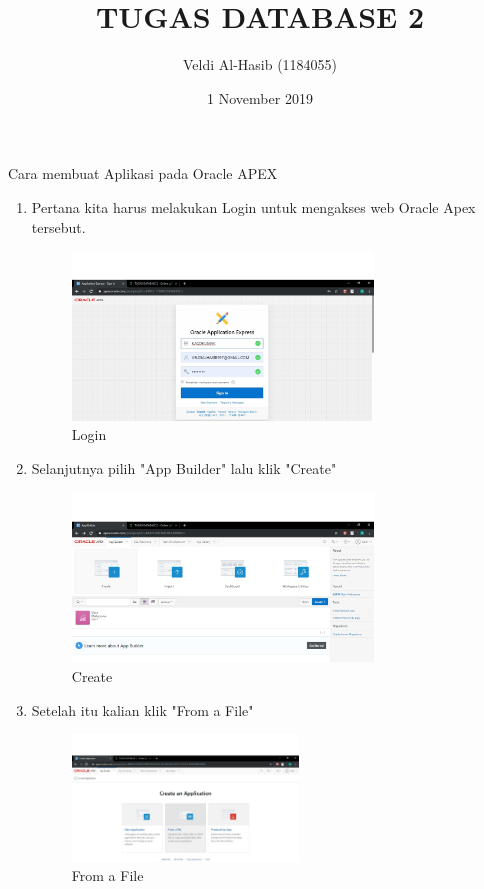 \documentclass{article}
\title{TUGAS DATABASE 2}
\author{Veldi Al-Hasib (1184055) }
\date{1 November 2019}
\begin{document}
\maketitle

\par
Cara membuat Aplikasi pada Oracle APEX
\begin{enumerate}
    \item Pertana kita harus melakukan Login untuk mengakses web Oracle Apex tersebut.
    \begin{figure}[h]
	\centering
	\includegraphics[width=8cm]{Figure/LOGIN.jpg}
	\caption{Login}
	\label{fig:gambar}
	\end{figure}

    \item Selanjutnya pilih "App Builder" lalu klik "Create"
    \begin{figure}[h]
	\centering
	\includegraphics[width=8cm]{Figure/CREATE.jpg}
	\caption{Create}
	\label{fig:gambar}
	\end{figure}

    \item Setelah itu kalian klik "From a File"
    \begin{figure}[h]
	\centering
	\includegraphics[width=6cm]{Figure/FOF.jpg}
	\caption{From a File}
	\label{fig:gambar}
	\end{figure}


\end{enumerate}
\end{document}
